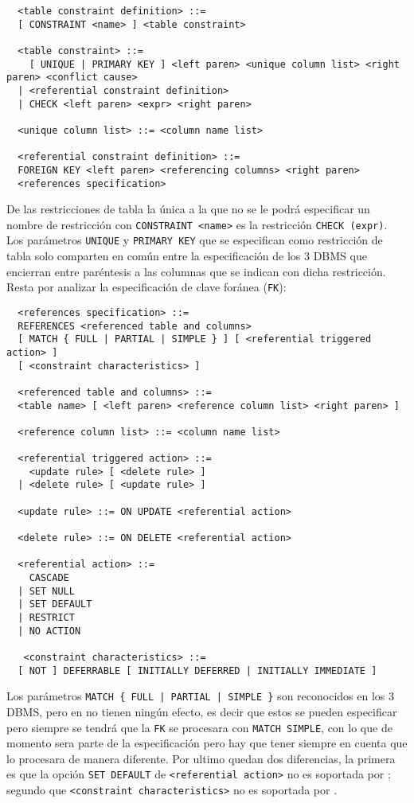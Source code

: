\begin{Verbatim}
  <table constraint definition> ::=
  [ CONSTRAINT <name> ] <table constraint>

  <table constraint> ::=
    [ UNIQUE | PRIMARY KEY ] <left paren> <unique column list> <right paren> <conflict cause>
  | <referential constraint definition>
  | CHECK <left paren> <expr> <right paren>

  <unique column list> ::= <column name list>

  <referential constraint definition> ::=
  FOREIGN KEY <left paren> <referencing columns> <right paren>
  <references specification>
\end{Verbatim}

De las restricciones de tabla la única a la que no se le podrá especificar un nombre de restricción con \verb=CONSTRAINT <name>= es la restricción \verb=CHECK (expr)=. Los parámetros \verb=UNIQUE= y \verb=PRIMARY KEY= que se especifican como restricción de tabla solo comparten en común entre la especificación de los 3 DBMS que encierran entre paréntesis a las columnas que se indican con dicha restricción. Resta por analizar la especificación de clave foránea (\verb=FK=):    

\begin{Verbatim}
  <references specification> ::=
  REFERENCES <referenced table and columns>
  [ MATCH { FULL | PARTIAL | SIMPLE } ] [ <referential triggered action> ]
  [ <constraint characteristics> ]

  <referenced table and columns> ::=
  <table name> [ <left paren> <reference column list> <right paren> ]

  <reference column list> ::= <column name list>

  <referential triggered action> ::=
    <update rule> [ <delete rule> ]
  | <delete rule> [ <update rule> ]

  <update rule> ::= ON UPDATE <referential action>

  <delete rule> ::= ON DELETE <referential action>

  <referential action> ::=
    CASCADE
  | SET NULL
  | SET DEFAULT
  | RESTRICT
  | NO ACTION

   <constraint characteristics> ::=
  [ NOT ] DEFERRABLE [ INITIALLY DEFERRED | INITIALLY IMMEDIATE ]
\end{Verbatim}
Los parámetros \verb=MATCH { FULL | PARTIAL | SIMPLE }= son reconocidos en los 3 DBMS, pero en \s no tienen ningún efecto, es decir que estos se pueden especificar pero siempre se tendrá que la \verb=FK= se procesara con \verb=MATCH SIMPLE=, con lo que de momento sera parte de la especificación pero hay que tener siempre en cuenta que \s lo procesara de manera diferente. Por ultimo quedan dos diferencias, la primera es que la opción \verb=SET DEFAULT= de \verb=<referential action>= no es soportada por \m; segundo que \verb=<constraint characteristics>= no es soportada por \m.\\

